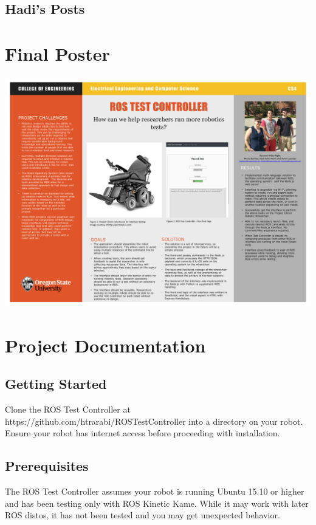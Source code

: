 \documentclass[onecolumn, draftclsnofoot,10pt, compsoc]{report}
\begin{document}
\section{Hadi's Posts}

\chapter{Final Poster}
\minitoc
\includegraphics[width=\textwidth]{team04.png}

\chapter{Project Documentation}

\minitoc
\section{Getting Started}


Clone the ROS Test Controller at https://github.com/htrarabi/ROSTestController into a directory on your robot. Ensure your robot has internet access before proceeding with installation.

\section{Prerequisites}

The ROS Test Controller assumes your robot is running Ubuntu 15.10 or higher and has been testing only with ROS Kinetic Kame. While it may work with later ROS distos, it has not been tested and you may get unexpected behavior.
\end{document}
